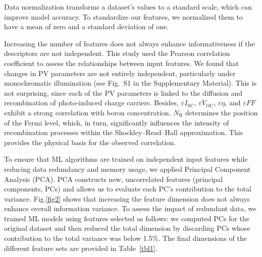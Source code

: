 \documentclass[a4paper,fleqn]{cas-sc}
\begin{document}
Data normalization transforms a dataset's values to a standard scale, which can improve model accuracy.
To standardize our features, we normalized them to have a mean of zero and a standard deviation of one.

Increasing the number of features does not always enhance informativeness if the descriptors are not independent.
This study used the Pearson correlation coefficient to assess the relationships between input features.
We found that changes in PV parameters are not entirely independent, particularly under monochromatic illumination 
(see Fig.~S1 in the Supplementary Material).
This is not surprising, since each of the PV parameters is linked to the diffusion and recombination of photo-induced charge carriers.
Besides,
$\varepsilon I_\mathrm{SC}$, $\varepsilon V_\mathrm{OC}$, $\varepsilon \eta$, and $\varepsilon F\!F$
exhibit a strong correlation with boron concentration.
$N_\mathrm{B}$ determines the position of the Fermi level, which, in turn, significantly influences 
the intensity of recombination processes within the Shockley–Read–Hall approximation.
This provides the physical basis for the observed correlation.

To ensure that ML algorithms are trained on independent input features while reducing data redundancy and memory usage, 
we applied Principal Component Analysis (PCA).
PCA constructs new, uncorrelated features (principal components, PCs) and allows us to evaluate each PC's contribution to the total variance.
Fig.\ref{fig2} shows that increasing the feature dimension does not always enhance overall information variance.
To assess the impact of redundant data, we trained ML models using features selected as follows: 
we computed PCs for the original dataset and then reduced the total dimension 
by discarding PCs whose contribution to the total variance was below 1.5\%.
The final dimensions of the different feature sets are provided in Table~\ref{tbl1}.
\end{document}
